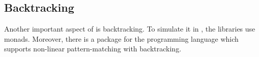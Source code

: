 \documentclass[thesis-solanki.tex]{subfiles}
\begin{document}
\begin{comment}
\begin{enumerate}
	\item unification-fd
	\item cmu
\end{enumerate}
\end{comment}

\subsection{Backtracking}

Another important aspect of  is backtracking.
To simulate it in , the libraries \cite{stream-monad-lib, logicst-lib} use monads.
Moreover, there is a package for the  programming language \cite{egison-lib} which supports
non-linear pattern-matching with backtracking.

\begin{comment}

\begin{enumerate}
	\item Egison \cite{egison-lib}
	\item stream-monad \cite{stream-monad-lib}
	\item logicst \cite{logicst-lib}
\end{enumerate}

\end{comment}


\begin{comment}
\section{Possibly Related Content}
\begin{enumerate}

\item Unifying Theories of Programming, C.A.R. Hoare,
\\* \url{http://www.unifyingtheories.org/}

\item Unifying Theories of Programming with Monads, Jeremy Gibbons,
\\* \url{http://www.cs.ox.ac.uk/people/jeremy.gibbons/publications/utp-monads.pdf}

\end{enumerate}
\end{comment}
\end{document}
